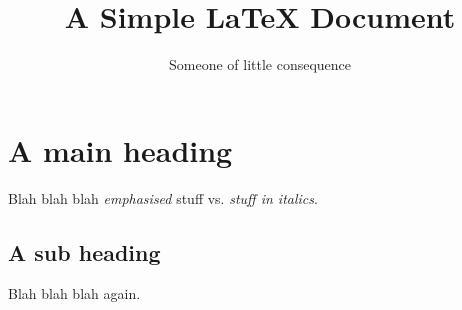 \documentclass{article}
\title{A Simple \LaTeX{} Document}
\author{Someone of little consequence}
\begin{document}
\maketitle

\section{A main heading}

Blah blah blah \emph{emphasised} stuff vs.
\textit{stuff in italics}.

\subsection{A sub heading}

Blah blah blah again.
\end{document}
